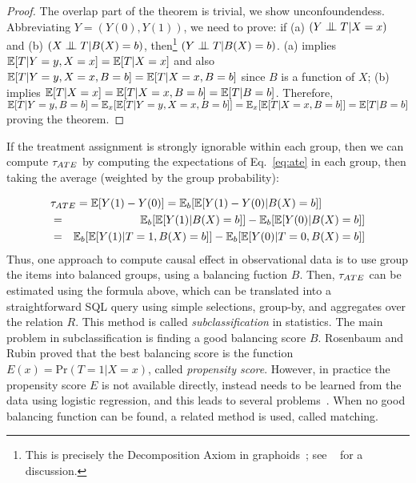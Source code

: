 \begin{proof}
  The overlap part of the theorem is trivial, we show
  unconfoundendess.  Abbreviating $Y = (Y(0),Y(1))$, we need to prove:
  if (a) $({Y \bigCI T} | X=x)$ and (b) $({X \bigCI T} | B(X)=b)$,
  then\footnote{This is precisely the Decomposition Axiom in
    graphoids~\cite[the. 1]{PearlBook1998}; see ~\cite{DBLP:journals/ipl/GyssensNG14} for a
    discussion.}  $({Y \bigCI T} | B(X)=b)$.  (a) implies
  $\mathbb{E}[T | Y=y, X=x] = \mathbb{E}[T | X=x]$ and also
  $\mathbb{E}[T | Y=y, X=x, B=b] = \mathbb{E}[T | X=x, B=b]$ since $B$ is a function
  of $X$; (b) implies $\mathbb{E}[T | X=x] = \mathbb{E}[T | X=x, B=b] = \mathbb{E}[T | B=b]$.
  Therefore,
  $\mathbb{E}[T | Y=y, B=b] = \mathbb{E}_x[\mathbb{E}[T | Y=y,X=x,B=b]] = \mathbb{E}_x[\mathbb{E}[T | X=x,
  B=b]] = \mathbb{E}[T | B=b]$ proving the theorem.
\end{proof}


If the treatment assignment is strongly ignorable within each group,
then we can compute ${\tau_{ATE}}$ by computing the expectations of
Eq.~\ref{eq:ate} in each group, then taking the average (weighted by
the group probability):

\vspace{-.3cm}
{
\begin{eqnarray}
\lefteqn{\ate = \E[Y(1)-Y(0)] = \E_b[\E[Y(1)-Y(0)| B(X)=b]]} \label{eq:oatt} \\
  &=& \E_b[\E[Y(1)|B(X)=b]]-\E_b[\E[Y(0)|B(X)=b]] \nonumber \\
  &=& \E_b[\E[Y(1)|T=1,B(X)=b]]-\E_b[\E[Y(0)|T=0,B(X)=b]] \nonumber
\end{eqnarray}
}
Thus, one approach to compute causal effect in observational data is
to use group the items into balanced groups, using a balancing fuction
$B$.  Then, ${\tau_{ATE}}$ can be estimated using the formula above, which can
be translated into a straightforward SQL query using simple
selections, group-by, and aggregates over the relation $R$.  This
method is called {\em subclassification} in statistics.  The main
problem in subclassification is finding a good balancing score $B$.
Rosenbaum and Rubin proved that the best balancing score is the
function $E(x) = \textrm{Pr}(T = 1 | X=x)$, called {\em propensity
  score}.  However, in practice the propensity score $E$ is not
available directly, instead needs to be learned from the data using
logistic regression, and this leads to several
problems~\cite{king15}.  When no good balancing function can be found,
a related method is used, called matching.



